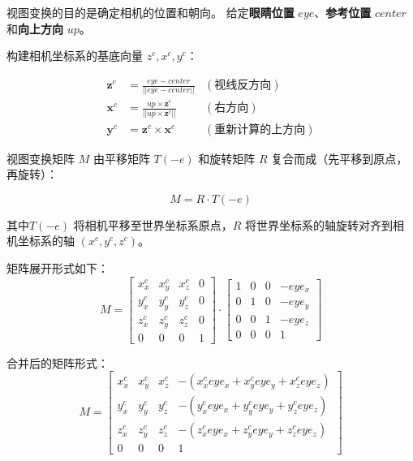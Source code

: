 \documentclass[12pt]{article}
\begin{document}
视图变换的目的是确定相机的位置和朝向。
给定\textbf{眼睛位置} $eye$、\textbf{参考位置} $center$ 和\textbf{向上方向} $up$。

构建相机坐标系的基底向量 $z^c, x^c, y^c$：

\begin{align}
    \mathbf{z}^c &= \frac{eye - center}{||eye - center||} & (\text{视线反方向}) \\
    \mathbf{x}^c &= \frac{up \times \mathbf{z}^c}{||up \times \mathbf{z}^c||} & (\text{右方向}) \\
    \mathbf{y}^c &= \mathbf{z}^c \times \mathbf{x}^c & (\text{重新计算的上方向})
\end{align}

视图变换矩阵 $M$ 由平移矩阵 $T(-e)$ 和旋转矩阵 $R$ 复合而成（先平移到原点，再旋转）：

\begin{equation}
    M = R \cdot T(-e)
\end{equation}

其中$T(-e)$ 将相机平移至世界坐标系原点，$R$ 将世界坐标系的轴旋转对齐到相机坐标系的轴 $(x^c, y^c, z^c)$。


矩阵展开形式如下：
\begin{equation}
    M = 
    \begin{bmatrix}
        x^c_x & x^c_y & x^c_z & 0 \\
        y^c_x & y^c_y & y^c_z & 0 \\
        z^c_x & z^c_y & z^c_z & 0 \\
        0 & 0 & 0 & 1
    \end{bmatrix}
    \cdot
    \begin{bmatrix}
        1 & 0 & 0 & -eye_x \\
        0 & 1 & 0 & -eye_y \\
        0 & 0 & 1 & -eye_z \\
        0 & 0 & 0 & 1
    \end{bmatrix}
\end{equation}

合并后的矩阵形式：
\begin{equation}
    M = 
    \begin{bmatrix}
        x^c_x & x^c_y & x^c_z & -(x^c_x eye_x + x^c_y eye_y + x^c_z eye_z) \\
        y^c_x & y^c_y & y^c_z & -(y^c_x eye_x + y^c_y eye_y + y^c_z eye_z) \\
        z^c_x & z^c_y & z^c_z & -(z^c_x eye_x + z^c_y eye_y + z^c_z eye_z) \\
        0 & 0 & 0 & 1
    \end{bmatrix}
\end{equation}
\end{document}
